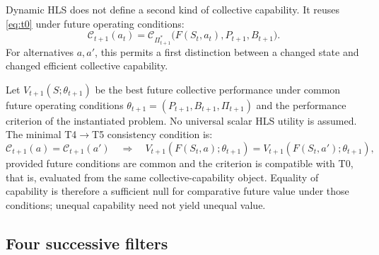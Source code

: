 \documentclass[10pt]{article}
\newcommand{\Ccap}{\mathcal{C}}
\begin{document}
Dynamic HLS does not define a second kind of collective capability. It reuses
\eqref{eq:t0} under future operating conditions:
\begin{equation}
\Ccap_{t+1}(a_t)=
\Ccap_{\Pi^*_{t+1}}\bigl(F(S_t,a_t),P_{t+1},B_{t+1}\bigr).
\label{eq:futurecap}
\end{equation}
For alternatives $a,a'$, this permits a first distinction between a changed
state and changed efficient collective capability.

Let $V_{t+1}(S;\theta_{t+1})$ be the best future collective performance under
common future operating conditions
$\theta_{t+1}=(P_{t+1},B_{t+1},\Pi_{t+1})$ and the performance criterion of
the instantiated problem. No universal scalar HLS utility is assumed. The
minimal T4$\rightarrow$T5 consistency condition is:
\begin{equation}
\Ccap_{t+1}(a)=\Ccap_{t+1}(a')
\quad\Longrightarrow\quad
V_{t+1}(F(S_t,a);\theta_{t+1})=
V_{t+1}(F(S_t,a');\theta_{t+1}),
\label{eq:consistency}
\end{equation}
provided future conditions are common and the criterion is compatible with T0,
that is, evaluated from the same collective-capability object. Equality of
capability is therefore a sufficient null for comparative future value under
those conditions; unequal capability need not yield unequal value.

\subsection{Four successive filters}
\end{document}
